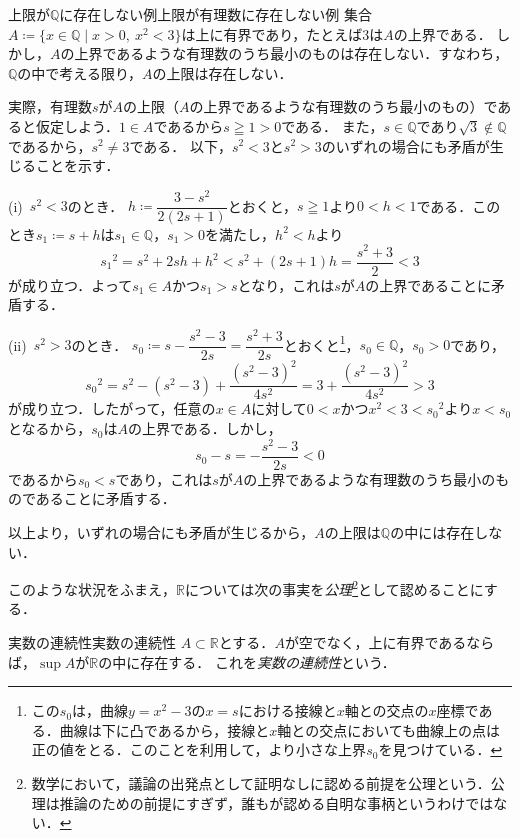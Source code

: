 \begin{example}{上限が$\mathbb{Q}$に存在しない例}{上限が有理数に存在しない例}
  集合$A \coloneqq \{x \in \mathbb{Q} \mid x>0,\ x^2<3\}$は上に有界であり，たとえば$3$は$A$の上界である．
  しかし，$A$の上界であるような有理数のうち最小のものは存在しない．すなわち，$\mathbb{Q}$の中で考える限り，$A$の上限は存在しない．

  実際，有理数$s$が$A$の上限（$A$の上界であるような有理数のうち最小のもの）であると仮定しよう．$1 \in A$であるから$s \geqq 1 > 0$である．
  また，$s \in \mathbb{Q}$であり$\sqrt{3} \notin \mathbb{Q}$であるから，$s^2 \ne 3$である．
  以下，$s^2 < 3$と$s^2 > 3$のいずれの場合にも矛盾が生じることを示す．

  (i)~$s^2 < 3$のとき．
  $h \coloneqq \dfrac{3 - s^2}{2(2s+1)}$とおくと，$s \geqq 1$より$0 < h < 1$である．このとき$s_1 \coloneqq s + h$は$s_1 \in \mathbb{Q}$，$s_1 > 0$を満たし，$h^2 < h$より
  \[
    {s_1}^2 = s^2 + 2sh + h^2 < s^2 + (2s+1)h = \frac{s^2+3}{2} < 3
  \]
  が成り立つ．よって$s_1 \in A$かつ$s_1 > s$となり，これは$s$が$A$の上界であることに矛盾する．

  (ii)~$s^2 > 3$のとき．
  $s_0 \coloneqq s - \dfrac{s^2-3}{2s} = \dfrac{s^2+3}{2s}$とおくと\footnote{この$s_0$は，曲線$y = x^2 - 3$の$x = s$における接線と$x$軸との交点の$x$座標である．曲線は下に凸であるから，接線と$x$軸との交点においても曲線上の点は正の値をとる．このことを利用して，より小さな上界$s_0$を見つけている．}，$s_0 \in \mathbb{Q}$，$s_0 > 0$であり，
  \[
    {s_0}^2 = s^2 - (s^2-3) + \frac{(s^2-3)^2}{4s^2} = 3 + \frac{(s^2-3)^2}{4s^2} > 3
  \]
  が成り立つ．したがって，任意の$x \in A$に対して$0 < x$かつ$x^2 < 3 < {s_0}^2$より$x < s_0$となるから，$s_0$は$A$の上界である．しかし，
  \[
    s_0 - s = - \frac{s^2-3}{2s} < 0
  \]
  であるから$s_0 < s$であり，これは$s$が$A$の上界であるような有理数のうち最小のものであることに矛盾する．

  以上より，いずれの場合にも矛盾が生じるから，$A$の上限は$\mathbb{Q}$の中には存在しない．
\end{example}

このような状況をふまえ，$\mathbb{R}$については次の事実を\emph{公理}\footnote{数学において，議論の出発点として証明なしに認める前提を公理という．公理は推論のための前提にすぎず，誰もが認める自明な事柄というわけではない．}として認めることにする．

\begin{axiom}{実数の連続性}{実数の連続性}
  $A \subset \mathbb{R}$とする．$A$が空でなく，上に有界であるならば，$\sup A$が$\mathbb{R}$の中に存在する．
  これを\emph{実数の連続性}という．
\end{axiom}

